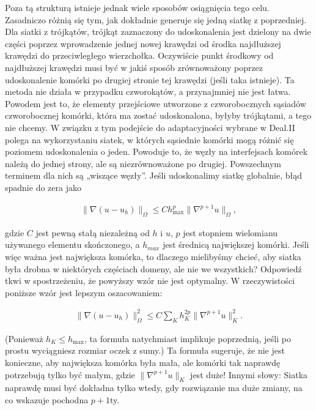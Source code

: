 \documentclass[]{pracamgr}
\begin{document}
        Poza tą strukturą istnieje jednak wiele sposobów osiągnięcia tego celu. Zasadniczo różnią się tym, jak dokładnie generuje się jedną siatkę z poprzedniej. Dla siatki z trójkątów, trójkąt zaznaczony do udoskonalenia jest dzielony na dwie części poprzez wprowadzenie jednej nowej krawędzi od środka najdłuższej krawędzi do przeciwległego wierzchołka. Oczywiście punkt środkowy od najdłuższej krawędzi musi być w jakiś sposób zrównoważony poprzez udoskonalenie komórki po drugiej stronie tej krawędzi (jeśli taka istnieje). Ta metoda nie działa w przypadku czworokątów, a przynajmniej nie jest łatwa. Powodem jest to, że elementy przejściowe utworzone z czworobocznych sąsiadów czworobocznej komórki, która ma zostać udoskonalona, byłyby trójkątami, a tego nie chcemy. W związku z tym podejście do adaptacyjności wybrane w Deal.II polega na wykorzystaniu siatek, w których sąsiednie komórki mogą różnić się poziomem udoskonalenia o jeden. Powoduje to, że węzły na interfejsach komórek należą do jednej strony, ale są niezrównoważone po drugiej. Powszechnym terminem dla nich są „wiszące węzły”. Jeśli udoskonalimy siatkę globalnie, błąd spadnie do zera jako

        \begin{align*}
          \|\nabla(u-u_h)\|_{\Omega} \le C h_\text{max}^p \| \nabla^{p+1} u \|_{\Omega},
        \end{align*}

        gdzie $C$ jest pewną stałą niezależną od $h$ i $u$, $p$ jest stopniem wielomianu używanego elementu skończonego, a $h_{max}$ jest średnicą największej komórki. Jeśli więc ważna jest największa komórka, to dlaczego mielibyśmy chcieć, aby siatka była drobna w niektórych częściach domeny, ale nie we wszystkich? Odpowiedź tkwi w spostrzeżeniu, że powyższy wzór nie jest optymalny. W rzeczywistości poniższe wzór jest lepszym oszacowaniem:

        \begin{align*}
          \|\nabla(u-u_h)\|_{\Omega}^2 \le C \sum_K h_K^{2p} \| \nabla^{p+1} u \|^2_K.
        \end{align*}

        (Ponieważ $h_K\le h_\text{max}$, ta formuła natychmiast implikuje poprzednią, jeśli po prostu wyciągniesz rozmiar oczek z sumy.) Ta formuła sugeruje, że nie jest konieczne, aby największa komórka była mała, ale komórki tak naprawdę potrzebują tylko być małym, gdzie $\| \nabla^{p+1} u \|_K$ jest duże! Innymi słowy: Siatka naprawdę musi być dokładna tylko wtedy, gdy rozwiązanie ma duże zmiany, na co wskazuje pochodna $p+1$ty.
        
\end{document}
